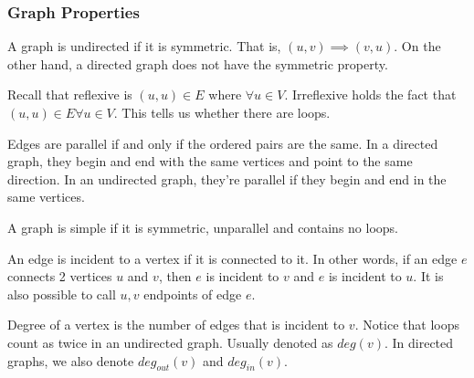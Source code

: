 \documentclass[a4paper]{article}
\theoremstyle{plain}
\theoremstyle{definition}
\newtheorem{defn}{Definition}[section]
\theoremstyle{remark}
\begin{document}
\subsubsection{Graph Properties}
\begin{tcolorbox}[colback=black!3!white,colframe=black!60!white,title=\begin{defn}Symmetry \label{Symmetry}\end{defn}]
A graph is undirected if it is symmetric. That is, $(u,v) \implies (v,u)$. On the other hand, a directed graph does not have the symmetric property.
\end{tcolorbox}
\begin{tcolorbox}[colback=black!3!white,colframe=black!60!white,title=\begin{defn}Reflexive \label{Reflexive}\end{defn}]
Recall that reflexive is $(u,u) \in E$ where $\forall u \in V$. Irreflexive holds the fact that $(u,u) \in E \forall u \in V$. This tells us whether there are loops.
\end{tcolorbox}
\begin{tcolorbox}[colback=black!3!white,colframe=black!60!white,title=\begin{defn}Parallel \label{Parallel}\end{defn}]
Edges are parallel if and only if the ordered pairs are the same. In a directed graph, they begin and end with the same vertices and point to the same direction. In an undirected graph, they're parallel if they begin and end in the same vertices.
\end{tcolorbox}
\begin{tcolorbox}[colback=black!3!white,colframe=black!60!white,title=\begin{defn}Simple Graph \label{Simple Graph}\end{defn}]
A graph is simple if it is symmetric, unparallel and contains no loops.
\end{tcolorbox}
\begin{tcolorbox}[colback=black!3!white,colframe=black!60!white,title=\begin{defn}Incident \label{Incident}\end{defn}]
An edge is incident to a vertex if it is connected to it. In other words, if an edge $e$ connects 2 vertices $u$ and $v$, then $e$ is incident to $v$ and $e$ is incident to $u$. It is also possible to call $u,v$ endpoints of edge $e$.
\end{tcolorbox}
\begin{tcolorbox}[colback=black!3!white,colframe=black!60!white,title=\begin{defn}Degree \label{Degree}\end{defn}]
Degree of a vertex is the number of edges that is incident to $v$. Notice that loops count as twice in an undirected graph. Usually denoted as $deg(v)$. In directed graphs, we also denote $deg_{out}(v)$ and $deg_{in}(v)$.
 \end{tcolorbox}
\end{document}
